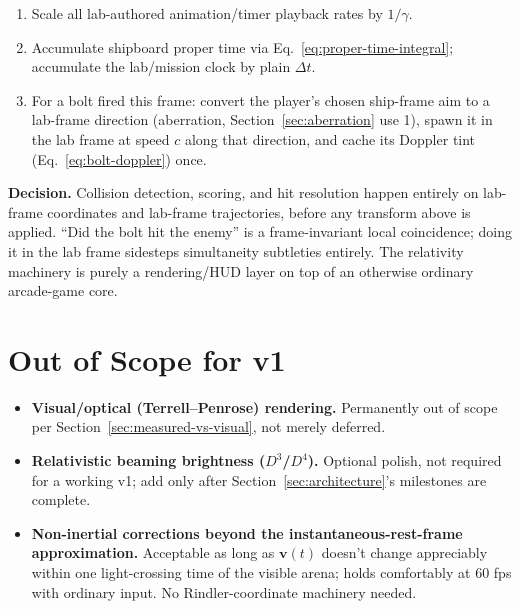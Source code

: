 \documentclass[11pt]{article}
\newcommand{\vb}[1]{\mathbf{#1}}
\newcommand{\uv}[1]{\hat{\mathbf{#1}}}
\newcommand{\decision}[1]{\par\smallskip\noindent\textbf{Decision.} #1\par\smallskip}
\begin{document}
\begin{enumerate}[leftmargin=1.7em]
\begin{enumerate}
    \item Apply the shape-contraction map, Eq.~\eqref{eq:shape-map}, to the sprite silhouette about $\vb r_i'$.
    \item Compute per-frame Doppler tint via Eq.~\eqref{eq:doppler-general} using this object's transformed angle from $\uv n$ (enemies/obstacles only -- in-flight bolts keep their cached spawn-time tint, Section~\ref{sec:bolt-doppler}).
  \end{enumerate}
  \item Scale all lab-authored animation/timer playback rates by $1/\gamma$.
  \item Accumulate shipboard proper time via Eq.~\eqref{eq:proper-time-integral}; accumulate the lab/mission clock by plain $\Delta t$.
  \item For a bolt fired this frame: convert the player's chosen ship-frame aim to a lab-frame direction (aberration, Section~\ref{sec:aberration} use 1), spawn it in the lab frame at speed $c$ along that direction, and cache its Doppler tint (Eq.~\eqref{eq:bolt-doppler}) once.
\end{enumerate}

\decision{Collision detection, scoring, and hit resolution happen entirely on lab-frame coordinates and lab-frame trajectories, before any transform above is applied. ``Did the bolt hit the enemy'' is a frame-invariant local coincidence; doing it in the lab frame sidesteps simultaneity subtleties entirely. The relativity machinery is purely a rendering/HUD layer on top of an otherwise ordinary arcade-game core.}

\section{Out of Scope for v1}
\label{sec:caveats}

\begin{itemize}[leftmargin=1.5em]
  \item \textbf{Visual/optical (Terrell--Penrose) rendering.} Permanently out of scope per Section~\ref{sec:measured-vs-visual}, not merely deferred.
  \item \textbf{Relativistic beaming brightness ($D^3$/$D^4$).} Optional polish, not required for a working v1; add only after Section~\ref{sec:architecture}'s milestones are complete.
  \item \textbf{Non-inertial corrections beyond the instantaneous-rest-frame approximation.} Acceptable as long as $\vb v(t)$ doesn't change appreciably within one light-crossing time of the visible arena; holds comfortably at 60 fps with ordinary input. No Rindler-coordinate machinery needed.
\end{itemize}
\end{document}
